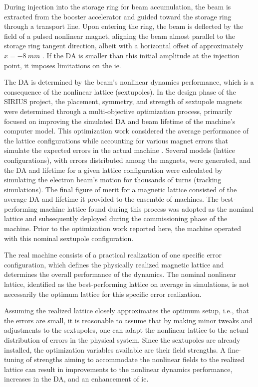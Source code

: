 During injection into the storage ring for beam accumulation, the beam is extracted from the booster accelerator and guided toward the storage ring through a transport line. Upon entering the ring, the beam is deflected by the field of a pulsed nonlinear magnet, aligning the beam almost parallel to the storage ring tangent direction, albeit with a horizontal offset of approximately $x=-8~\unit{mm}$ \cite{liu_injection_2016}. If the \gls*{DA}  is smaller than this initial amplitude at the injection point, it imposes limitations on the \gls*{ie}.

The \gls*{DA} is determined by the beam's nonlinear dynamics performance, which is a consequence of the nonlinear lattice (sextupoles). In the design phase of the SIRIUS project, the placement, symmetry, and strength of sextupole magnets were determined through a multi-objective optimization process, primarily focused on improving the simulated \gls*{DA} and beam lifetime of the machine's computer model\cite{de_sa_optimization_2016, dester_energy_2017}. This optimization work considered the average performance of the lattice configurations while accounting for various magnet errors that simulate the expected errors in the actual machine \cite{de_sa_optimization_2016}. Several models (lattice configurations), with errors distributed among the magnets, were generated, and the \gls*{DA} and lifetime for a given lattice configuration were calculated by simulating the electron beam's motion for thousands of turns (tracking simulations). The final figure of merit for a magnetic lattice consisted of the average \gls*{DA} and lifetime it provided to the ensemble of machines. The best-performing machine lattice found during this process was adopted as the nominal lattice and subsequently deployed during the commissioning phase of the machine. Prior to the optimization work reported here, the machine operated with this nominal sextupole configuration.

The real machine consists of a practical realization of one specific error configuration, which defines the physically realized magnetic lattice and determines the overall performance of the dynamics. The nominal nonlinear lattice, identified as the best-performing lattice on average in simulations, is not necessarily the optimum lattice for this specific error realization.

Assuming the realized lattice closely approximates the optimum setup, i.e., that the errors are small, it is reasonable to assume that by making minor tweaks and adjustments to the sextupoles, one can adapt the nonlinear lattice to the actual distribution of errors in the physical system. Since the sextupoles are already installed, the optimization variables available are their field strengths. A fine-tuning of strengths aiming to accommodate the nonlinear fields to the realized lattice can result in improvements to the nonlinear dynamics performance, increases in the \gls*{DA}, and an enhancement of \gls*{ie}.

